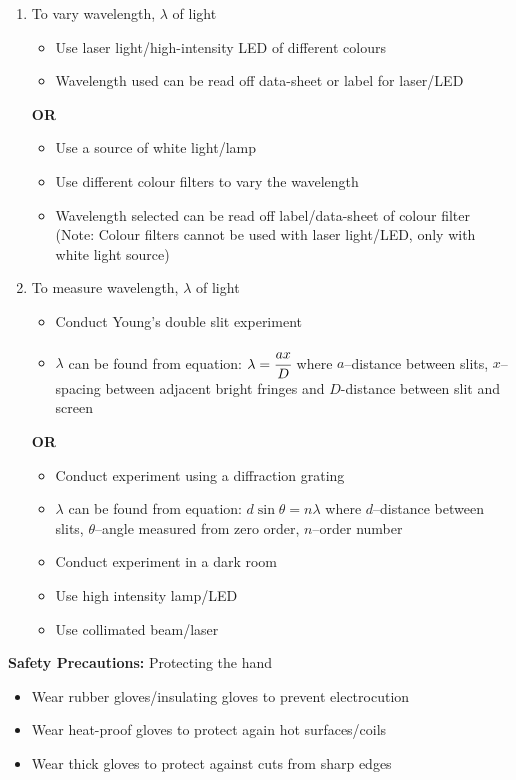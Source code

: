 \documentclass{article}
\begin{document}
\begin{enumerate}
    \item To vary wavelength, $\lambda$ of light
\begin{itemize}
        \item Use laser light/high-intensity LED of different colours
        \item  Wavelength used can be read off data-sheet or label for laser/LED
\end{itemize}
\textbf{OR}
\begin{itemize}
        \item Use a source of white light/lamp
        \item  Use different colour filters to vary the wavelength
        \item Wavelength selected can be read off label/data-sheet of colour filter
(Note: Colour filters cannot be used with laser light/LED, only with white light source)
\end{itemize}
\item To measure wavelength, $\lambda$ of light
\begin{itemize}
    \item Conduct Young’s double slit experiment
    \item $\lambda$ can be found from equation:  $\lambda=\cfrac{ax}{D}$
where $a$–distance between slits, $x$–spacing between adjacent bright fringes and $D$-distance between slit and screen
\end{itemize}
\textbf{OR}
\begin{itemize}
    \item Conduct experiment using a diffraction grating
    \item $\lambda$ can be found from equation: $d\sin \theta=n\lambda$
where $d$–distance between slits, $\theta$–angle measured from zero order, $n$–order
number
    \item  Conduct experiment in a dark room
    \item Use high intensity lamp/LED
    \item  Use collimated beam/laser
\end{itemize}
\end{enumerate}

\begin{flushleft}
\textbf{Safety Precautions:}
Protecting the hand
\end{flushleft}
\begin{itemize}
    \item Wear rubber gloves/insulating gloves to prevent electrocution
    \item Wear heat-proof gloves to protect again hot surfaces/coils
    \item Wear thick gloves to protect against cuts from sharp edges
\end{itemize}
\end{document}
